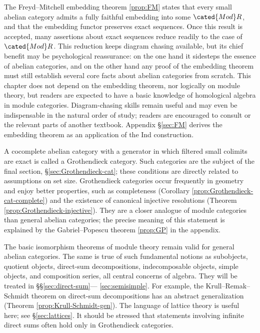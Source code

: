 The Freyd--Mitchell embedding theorem \ref{prop:FM} states that every small
abelian category admits a fully faithful embedding into some
$\cated{Mod}R$, and that the embedding functor preserves exact sequences.
Once this result is accepted, many assertions about exact sequences reduce
readily to the case of $\cated{Mod}R$. This reduction keeps diagram chasing
available, but its chief benefit may be psychological reassurance: on the one
hand it sidesteps the essence of abelian categories, and on the other hand any
proof of the embedding theorem must still establish several core facts about
abelian categories from scratch. This chapter does not depend on the
embedding theorem, nor logically on module theory, but readers are expected
to have a basic knowledge of homological algebra in module categories.
Diagram-chasing skills remain useful and may even be indispensable in the
natural order of study; readers are encouraged to consult \cite{Li1} or the
relevant parts of another textbook. Appendix \S\ref{sec:FM} derives the
embedding theorem as an application of the Ind construction.

A cocomplete abelian category with a generator in which filtered small
colimits are exact is called a Grothendieck category. Such categories are the
subject of the final section, \S\ref{sec:Grothendieck-cat}; these conditions
are directly related to assumptions on set size. Grothendieck categories
occur frequently in geometry and enjoy better properties, such as
completeness (Corollary \ref{prop:Grothendieck-cat-complete}) and the existence
of canonical injective resolutions (Theorem
\ref{prop:Grothendieck-injective}). They are a closer analogue of module
categories than general abelian categories; the precise meaning of this
statement is explained by the Gabriel--Popescu theorem \ref{prop:GP} in the
appendix.

The basic isomorphism theorems of module theory remain valid for general
abelian categories. The same is true of such fundamental notions as
subobjects, quotient objects, direct-sum decompositions, indecomposable
objects, simple objects, and composition series, all central concerns of
algebra. They will be treated in \S\S\ref{sec:direct-sum}---
\ref{sec:semisimple}. For example, the Krull--Remak--Schmidt theorem on
direct-sum decompositions has an abstract generalization (Theorem
\ref{prop:Krull-Schmidt-gen}). The language of lattice theory is useful here;
see \S\ref{sec:lattices}. It should be stressed that statements involving
infinite direct sums often hold only in Grothendieck categories.

